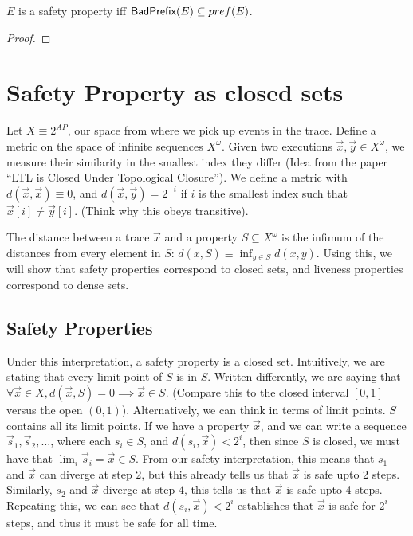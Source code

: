 \begin{theorem}
$E$ is a safety property iff $\textsf{BadPrefix}(E) \subseteq pref(E)$.
\end{theorem}
\begin{proof}
\end{proof}

\section{Safety Property as closed sets}

Let $X \equiv 2^{AP}$, our space from where we pick up events in the trace.
Define a metric on the space of infinite sequences $X^\omega$. Given two executions $\vec x, \vec y \in X^\omega$, 
we measure their similarity in the smallest index they differ (Idea from the paper ``LTL is Closed Under Topological Closure'').
We define a metric with $d(\vec x, \vec x) \equiv 0$, and $d(\vec x, \vec y) = 2^{-i}$ if $i$ is the smallest index such that $\vec x[i] \neq \vec y[i]$.
(Think why this obeys transitive).

The distance between a trace $\vec x$ and a property $S \subseteq X^\omega$ is the infimum of the distances from every element in $S$: $d(x, S) \equiv \inf_{y \in S} d(x, y)$.
Using this, we will show that safety properties correspond to closed sets, and liveness properties correspond to dense sets.

\subsection{Safety Properties}
Under this interpretation, a safety property is a closed set.
Intuitively, we are stating that every limit point of $S$ is in $S$.
Written differently, we are saying that $\forall \vec x \in X, d(\vec x, S) = 0 \implies \vec x \in S$. (Compare this to the closed interval $[0, 1]$ versus the open $(0, 1)$).
Alternatively, we can think in terms of limit points. $S$ contains all its limit points.
If we have a property $\vec x$, and we can write a sequence $\vec s_1, \vec s_2, \dots$,
where each $s_i \in S$, and $d(s_i, \vec x) < 2^i$,
then since $S$ is closed, we must have that $\lim_i \vec s_i = \vec x \in S$.
From our safety interpretation, this means that $s_1$ and $\vec x$ can diverge at step $2$, but this already tells us that $\vec x$ is safe upto 2 steps.
Similarly, $s_2$ and $\vec x$ diverge at step $4$, this tells us that $\vec x$ is safe upto 4 steps.
Repeating this, we can see that $d(s_i, \vec x) < 2^i$ establishes that $\vec x$ is safe for $2^i$ steps,
and thus it must be safe for all time.


